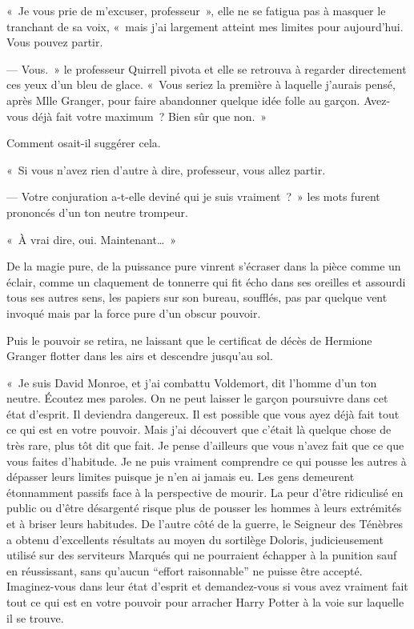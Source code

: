 «~Je vous prie de m'excuser, professeur~», elle ne se fatigua pas à masquer le tranchant de sa voix, «~mais j'ai largement atteint mes limites pour aujourd'hui. Vous pouvez partir.

--- Vous.~» le professeur Quirrell pivota et elle se retrouva à regarder directement ces yeux d'un bleu de glace. «~Vous seriez la première à laquelle j'aurais pensé, après Mlle Granger, pour faire abandonner quelque idée folle au garçon. Avez-vous déjà fait votre maximum~? Bien sûr que non.~»

Comment osait-il suggérer cela.

«~Si vous n'avez rien d'autre à dire, professeur, vous allez partir.

--- Votre conjuration a-t-elle deviné qui je suis vraiment~?~» les mots furent prononcés d'un ton neutre trompeur.

«~À vrai dire, oui. Maintenant…~»

De la magie pure, de la puissance pure vinrent s'écraser dans la pièce comme un éclair, comme un claquement de tonnerre qui fit écho dans ses oreilles et assourdi tous ses autres sens, les papiers sur son bureau, soufflés, pas par quelque vent invoqué mais par la force pure d'un obscur pouvoir.

Puis le pouvoir se retira, ne laissant que le certificat de décès de Hermione Granger flotter dans les airs et descendre jusqu'au sol.

«~Je suis David Monroe, et j'ai combattu Voldemort, dit l'homme d'un ton neutre. Écoutez mes paroles. On ne peut laisser le garçon poursuivre dans cet état d'esprit. Il deviendra dangereux. Il est possible que vous ayez déjà fait tout ce qui est en votre pouvoir. Mais j'ai découvert que c'était là quelque chose de très rare, plus tôt dit que fait. Je pense d'ailleurs que vous n'avez fait que ce que vous faites d'habitude. Je ne puis vraiment comprendre ce qui pousse les autres à dépasser leurs limites puisque je n'en ai jamais eu. Les gens demeurent étonnamment passifs face à la perspective de mourir. La peur d'être ridiculisé en public ou d'être désargenté risque plus de pousser les hommes à leurs extrémités et à briser leurs habitudes. De l'autre côté de la guerre, le Seigneur des Ténèbres a obtenu d'excellents résultats au moyen du sortilège Doloris, judicieusement utilisé sur des serviteurs Marqués qui ne pourraient échapper à la punition sauf en réussissant, sans qu'aucun “effort raisonnable” ne puisse être accepté. Imaginez-vous dans leur état d'esprit et demandez-vous si vous avez vraiment fait tout ce qui est en votre pouvoir pour arracher Harry Potter à la voie sur laquelle il se trouve.

